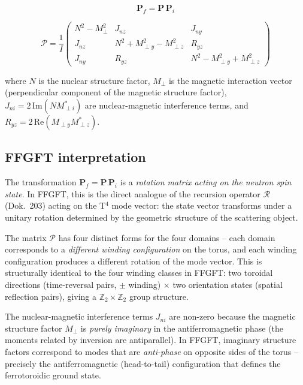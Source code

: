 \begin{equation}
  \mathbf{P}_f = \mathbf{P}\,\mathbf{P}_i
  \tag{Paper~Eq.~2}
\end{equation}

\begin{equation}
  \mathcal{P} = \frac{1}{I}
  \begin{pmatrix}
    N^2 - M_\perp^2 & J_{nz} & J_{ny} \\
    J_{nz} & N^2 + M_{\perp y}^2 - M_{\perp z}^2 & R_{yz} \\
    J_{ny} & R_{yz} & N^2 - M_{\perp y}^2 + M_{\perp z}^2
  \end{pmatrix}
  \tag{Paper~Eq.~3}
\end{equation}

\noindent where $N$ is the nuclear structure factor, $M_\perp$ is the magnetic
interaction vector (perpendicular component of the magnetic structure factor),
$J_{ni} = 2\,\mathrm{Im}(NM_{\perp i}^*)$ are nuclear-magnetic interference
terms, and $R_{yz} = 2\,\mathrm{Re}(M_{\perp y}M_{\perp z}^*)$.

\subsection*{FFGFT interpretation}

The transformation $\mathbf{P}_f = \mathbf{P}\,\mathbf{P}_i$ is a
\emph{rotation matrix acting on the neutron spin state}. In FFGFT, this is
the direct analogue of the recursion operator $\mathcal{R}$ (Dok.~203) acting
on the T$^4$ mode vector: the state vector transforms under a unitary rotation
determined by the geometric structure of the scattering object.

The matrix $\mathcal{P}$ has four distinct forms for the four domains -- each
domain corresponds to a \emph{different winding configuration} on the torus,
and each winding configuration produces a different rotation of the mode
vector. This is structurally identical to the four winding classes in FFGFT:
two toroidal directions (time-reversal pairs, $\pm$ winding) $\times$ two
orientation states (spatial reflection pairs), giving a $\mathbb{Z}_2 \times
\mathbb{Z}_2$ group structure.

The nuclear-magnetic interference terms $J_{ni}$ are non-zero because the
magnetic structure factor $M_\perp$ is \emph{purely imaginary} in the
antiferromagnetic phase (the moments related by inversion are antiparallel).
In FFGFT, imaginary structure factors correspond to modes that are
\emph{anti-phase} on opposite sides of the torus -- precisely the
antiferromagnetic (head-to-tail) configuration that defines the ferrotoroidic
ground state.

